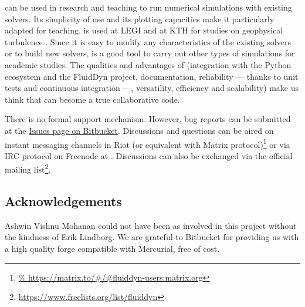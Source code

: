 
 can be used in research and teaching to run numerical simulations
with existing solvers.
%
Its simplicity of use and its plotting capacities make it particularly adapted for
teaching.
%
 is used at LEGI and at KTH for studies on geophysical turbulence
\cite[see for example][]{LindborgMohanan2017}.
%
Since it is easy to modify any characteristics of the existing solvers or to build
new solvers,  is a good tool to carry out other types of
simulations for academic studies.
%
The qualities and advantages of  (integration with the Python
ecosystem and the FluidDyn project, documentation, reliability --- thanks to unit tests
and continuous integration ---, versatility, efficiency and scalability) make us think
that  can become a true collaborative code.

There is no formal support mechanism. However, bug reports can be submitted at
the \href{https://bitbucket.org/fluiddyn/fluidsim/issues}{Issues page on
Bitbucket}. Discussions and questions can be aired on instant messaging
channels in Riot (or equivalent with Matrix protocol)\footnote{
\url{%
  https://matrix.to/\#/\#fluiddyn-users:matrix.org}}
or via IRC protocol on Freenode at . Discussions
can also be exchanged via the official mailing list\footnote{
\url{https://www.freelists.org/list/fluiddyn}}.

\subsection{Acknowledgements}


Ashwin Vishnu Mohanan could not have been as involved in this project without the
kindness of Erik Lindborg.
%
We are grateful to Bitbucket for providing us with a high quality forge
compatible with Mercurial, free of cost.

